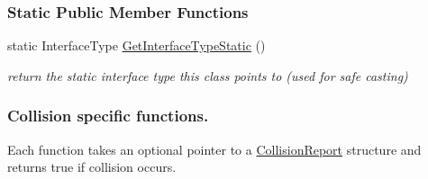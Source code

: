 \subsubsection*{Static Public Member Functions}
\begin{DoxyCompactItemize}
\item 
\hypertarget{classOpenRAVE_1_1CollisionCheckerBase_affeafe65e7c4094f282d273dedbf069b}{
static InterfaceType \hyperlink{classOpenRAVE_1_1CollisionCheckerBase_affeafe65e7c4094f282d273dedbf069b}{GetInterfaceTypeStatic} ()}
\label{classOpenRAVE_1_1CollisionCheckerBase_affeafe65e7c4094f282d273dedbf069b}

\begin{DoxyCompactList}\small\item\em return the static interface type this class points to (used for safe casting) \item\end{DoxyCompactList}\end{DoxyCompactItemize}
\subsubsection*{Collision specific functions.}
\label{_amgrpef0faa32f592cc67b0a4ecf86076aa0d}
 Each function takes an optional pointer to a \hyperlink{classOpenRAVE_1_1CollisionReport}{CollisionReport} structure and returns true if collision occurs.

